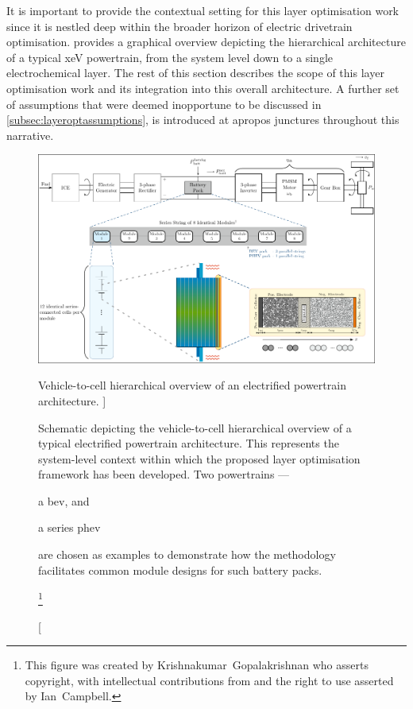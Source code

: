 It is  important to provide the  contextual setting for this  layer optimisation
work since it is nestled deep  within the broader horizon of electric drivetrain
optimisation.   provides a  graphical overview
depicting the hierarchical architecture of  a typical \gls{xeV} powertrain, from
the  system level  down to  a  single electrochemical  layer. The  rest of  this
section describes the scope of this  layer optimisation work and its integration
into this  overall architecture. A further  set of assumptions that  were deemed
inopportune to be discussed  in \cref{subsec:layeroptassumptions}, is introduced
at apropos junctures throughout this narrative.

\begin{figure}[!bp]
    \begin{minipage}[t]{\textwidth}
        \centering
        \includegraphics[width=\textwidth]{hierarchical_powertrain_to_cell_layer.pdf}
        \caption
        [%
        Vehicle-to-cell hierarchical overview of an electrified powertrain architecture.
        ]%
        {%
            Schematic depicting the vehicle-to-cell hierarchical overview of
            a typical electrified powertrain architecture. This represents the
            system-level context within which the proposed layer optimisation framework
            has been developed. Two  powertrains ---
            \begin{enumerate*}[label=\itshape\alph*\upshape)]
                \item a \gls{bev}, and
                \item a series \gls{phev}
            \end{enumerate*}
            are chosen as examples to demonstrate how the methodology facilitates
            common module designs for such battery packs\footnotemark.
        }%
        \label{fig:fig_PowertrainSchematic}
        \mpfootnotes[1]
        \footnote{This figure was created by \mbox{Krishnakumar Gopalakrishnan} who
            asserts copyright, with intellectual contributions from and the right to
        use asserted by \mbox{Ian Campbell}.}
    \end{minipage}
\end{figure}

